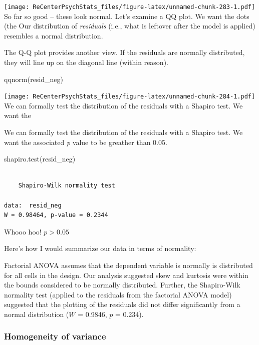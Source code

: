 \documentclass[
  11pt,
]{book}
\newenvironment{Shaded}{\begin{snugshade}}{\end{snugshade}}
\newcommand{\FunctionTok}[1]{\textcolor[rgb]{0.00,0.00,0.00}{#1}}
\newcommand{\NormalTok}[1]{#1}
\begin{document}
\texttt{[image: ReCenterPsychStats\_files/figure-latex/unnamed-chunk-283-1.pdf]}
So far so good -- these look normal. Let's examine a QQ plot. We want the dots (the
Our distribution of \emph{residuals} (i.e., what is leftover after the model is applied) resembles a normal distribution.

The Q-Q plot provides another view. If the residuals are normally distributed, they will line up on the diagonal line (within reason).

\begin{Shaded}
\begin{Highlighting}[]
\FunctionTok{qqnorm}\NormalTok{(resid\_neg)}
\end{Highlighting}
\end{Shaded}

\texttt{[image: ReCenterPsychStats\_files/figure-latex/unnamed-chunk-284-1.pdf]}
We can formally test the distribution of the residuals with a Shapiro test. We want the

We can formally test the distribution of the residuals with a Shapiro test. We want the associated \emph{p} value to be greather than 0.05.

\begin{Shaded}
\begin{Highlighting}[]
\FunctionTok{shapiro.test}\NormalTok{(resid\_neg)}
\end{Highlighting}
\end{Shaded}

\begin{verbatim}

    Shapiro-Wilk normality test

data:  resid_neg
W = 0.98464, p-value = 0.2344
\end{verbatim}

Whooo hoo! \(p > 0.05\)

Here's how I would summarize our data in terms of normality:

Factorial ANOVA assumes that the dependent variable is normally is distributed for all cells in the design. Our analysis suggested skew and kurtosis were within the bounds considered to be normally distributed. Further, the Shapiro-Wilk normality test (applied to the residuals from the factorial ANOVA model) suggested that the plotting of the residuals did not differ significantly from a normal distribution (\(W\) = 0.9846, \(p\) = 0.234).

\hypertarget{homogeneity-of-variance}{%
\subsubsection{Homogeneity of variance}\label{homogeneity-of-variance}}
\end{document}
